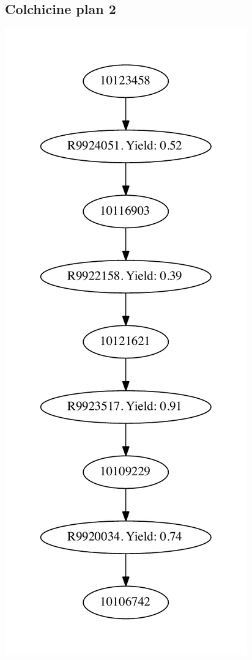\documentclass[a4paper,10pt,titlepage]{paper}
\begin{document}
\subsection{Colchicine plan 2}
\centering
\includegraphics[scale=0.4]{Synteseplaner/Colchicine/plan2.pdf}
\label{Appendix::Colchicine2}
\end{document}

